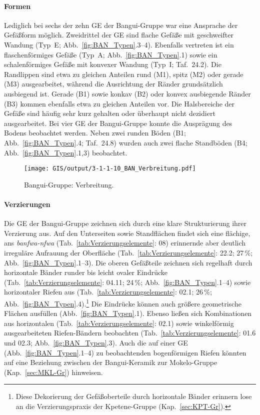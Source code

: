 \paragraph{Formen}
$\;$ \\
Lediglich bei sechs der zehn GE der Bangui-Gruppe war eine Ansprache der Gefäßform möglich. Zweidrittel der GE sind flache Gefäße mit geschweifter Wandung (Typ~E; Abb.~\ref{fig:BAN_Typen}.3--4). Ebenfalls vertreten ist ein flaschenförmiges Gefäße (Typ~A; Abb.~\ref{fig:BAN_Typen}.1) sowie ein schalenförmiges Gefäße mit konvexer Wandung (Typ~I; Taf.~24.2). Die Randlippen sind etwa zu gleichen Anteilen rund (M1), spitz (M2) oder gerade (M3) ausgearbeitet, während die Ausrichtung der Ränder grundsätzlich ausbiegend ist. Gerade (B1) sowie konkav (B2) oder konvex ausbiegende Ränder (B3) kommen ebenfalls etwa zu gleichen Anteilen vor. Die Halsbereiche der Gefäße sind häufig sehr kurz gehalten oder überhaupt nicht dezidiert ausgearbeitet. Bei vier GE der Bangui-Gruppe konnte die Ausprägung des Bodens beobachtet werden. Neben zwei runden Böden (B1; Abb.~\ref{fig:BAN_Typen}.4; Taf.~24.8) wurden auch zwei flache Standböden (B4; Abb.~\ref{fig:BAN_Typen}.1,3) beobachtet.

\begin{figure*}[p]
	\centering
	\texttt{[image: GIS/output/3-1-1-10\_BAN\_Verbreitung.pdf]}
	\caption{Bangui-Gruppe: Verbreitung.}
	\label{fig:BAN_Verbreitung}
\end{figure*}

\paragraph{Verzierungen}
$\;$ \\
Die GE der Bangui-Gruppe zeichnen sich durch eine klare Strukturierung ihrer Verzierung aus. Auf den Unterseiten sowie Standflächen findet sich eine flächige, ans \textit{banfwa-nfwa} (Tab.~\ref{tab:Verzierungselemente}: 08) erinnernde aber deutlich irreguläre Aufrauung der Oberfläche (Tab.~\ref{tab:Verzierungselemente}: 22.2; 27\,\%; Abb.~\ref{fig:BAN_Typen}.1--3). Die oberen Gefäßteile zeichnen sich regelhaft durch horizontale Bänder runder bis leicht ovaler Eindrücke (Tab.~\ref{tab:Verzierungselemente}: 04.11; 24\,\%; Abb.~\ref{fig:BAN_Typen}.1--4) sowie horizontaler Riefen aus (Tab.~\ref{tab:Verzierungselemente}: 02.1; 26\,\%; Abb.~\ref{fig:BAN_Typen}.4).\footnote{Diese Dekorierung der Gefäßoberteile durch horizontale Bänder erinnern lose an die Verzierungspraxis der Kpetene-Gruppe (Kap.~\ref{sec:KPT-Gr}).} Die Eindrücke können auch größere geometrische Flächen ausfüllen (Abb.~\ref{fig:BAN_Typen}.1). Ebenso ließen sich Kombinationen aus horizontalen (Tab.~\ref{tab:Verzierungselemente}: 02.1) sowie winkelförmig ausgearbeiteten Riefen-Bändern beobachten (Tab.~\ref{tab:Verzierungselemente}: 01.6 und 02.3; Abb.~\ref{fig:BAN_Typen}.3). Auch die auf einer GE (Abb.~\ref{fig:BAN_Typen}.1--4) zu beobachtenden bogenförmigen Riefen könnten auf eine Beziehung zwischen der Bangui-Keramik zur Mokelo-Gruppe (Kap.~\ref{sec:MKL-Gr}) hinweisen.


